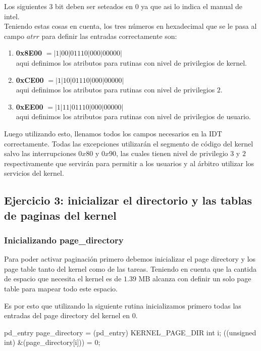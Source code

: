 \documentclass[a4paper,10pt,twoside]{article}
\newenvironment{pseudocodigo}
    {\vspace{0.5em} \begin{algorithmic}}
    {\end{algorithmic} \vspace{0.5em}}
\begin{document}
Los siguientes 3 bit deben ser seteados en $0$ ya que asi lo indica el manual de intel.\\

Teniendo estas cosas en cuenta, los tres números en hexadecimal que se le pasa al campo $atrr$ para definir las entradas correctamente son:

\begin{enumerate}
 \item  \textbf{0x8E00} $= | 1 | 0 0 | 0 1 1 1 0 | 0 0 0 | 0 0 0 0 0 | $ \\ aqui definimos los atributos para rutinas con nivel de privilegios de kernel.
 \item \textbf{0xCE00} $= | 1 | 1 0 | 0 1 1 1 0 | 0 0 0 | 0 0 0 0 0 | $ \\ aqui definimos los atributos para rutinas con nivel de privilegios $2$.
 \item \textbf{0xEE00} $= | 1 | 1 1 | 0 1 1 1 0 | 0 0 0 | 0 0 0 0 0 | $ \\ aqui definimos los atributos para rutinas con nivel de privilegios de usuario.
\end{enumerate}

Luego utilizando esto, llenamos todos los campos necesarios en la IDT correctamente. Todas las excepciones utilizarán el segmento de código del kernel salvo las interrupciones $0x80$ y $0x90$, las cuales tienen nivel de privilegio $3$ y $2$ respectivamente que servirán para permitir a los usuarios y al árbitro utilizar los servicios del kernel.

\subsection{Ejercicio 3: inicializar el directorio y las tablas de paginas del kernel}
\subsubsection{Inicializando page\_directory}
Para poder activar paginación primero debemos inicializar el page directory y los page table tanto del kernel como de las tareas. Teniendo en cuenta que la cantida de espacio que necesita el kernel es de $1.39$ MB alcanza con definir un solo page table para mapear todo este espacio.

Es por esto que utilizando la siguiente rutina inicializamos primero todas las entradas del page directory del kernel en $0$.

\begin{pseudocodigo}
  \STATE pd\_entry\* page\_directory = (pd\_entry\*) KERNEL\_PAGE\_DIR
  \STATE int i;
    \STATE \*((unsigned int\*) \&(page\_directory[i])) = 0;
  \ENDFOR
\end{pseudocodigo}
\end{document}
